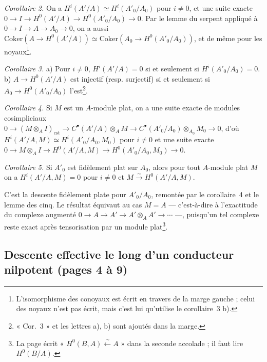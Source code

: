 \documentclass[11pt,a4paper]{article}
\begin{document}
\emph{Corollaire 2.} On a $H^i(A'/A) \simeq H^i(A'_0/A_0)$ pour $i \neq 0$,
et une suite exacte $0 \to I \to H^0(A'/A) \to H^0(A'_0/A_0) \to 0$. Par
le lemme du serpent appliqué à $0 \to I \to A \to A_0 \to 0$, on a aussi
$\mathrm{Coker}(A \to H^0(A'/A)) \simeq \mathrm{Coker}(A_0 \to
H^0(A'_0/A_0))$, et de même pour les noyaux\footnote{L'isomorphisme des
conoyaux est écrit en travers de la marge gauche ; celui des noyaux n'est pas
écrit, mais c'est lui qu'utilise le corollaire~3 b).}.

\emph{Corollaire 3.} a) Pour $i \neq 0$, $H^i(A'/A) = 0$ si et seulement si
$H^i(A'_0/A_0) = 0$. b) $A \to H^0(A'/A)$ est injectif (resp. surjectif) si
et seulement si $A_0 \to H^0(A'_0/A_0)$ l'est\footnote{« Cor.~3 » et les
lettres a), b) sont ajoutés dans la marge.}.

\emph{Corollaire 4.} Si $M$ est un $A$-module plat, on a une suite exacte de
modules cosimpliciaux $0 \to (M \otimes_A I)_{\mathrm{cst}} \to
C^{\bullet}(A'/A) \otimes_A M \to C^{\bullet}(A'_0/A_0) \otimes_{A_0} M_0
\to 0$, d'où $H^i(A'/A, M) \simeq H^i(A'_0/A_0, M_0)$ pour $i \neq 0$ et une
suite exacte $0 \to M \otimes_A I \to H^0(A'/A, M) \to H^0(A'_0/A_0, M_0)
\to 0$.

\emph{Corollaire 5.} Si $A'_0$ est fidèlement plat sur $A_0$, alors pour
tout $A$-module plat $M$ on a $H^i(A'/A, M) = 0$ pour $i \neq 0$ et $M
\xrightarrow{\sim} H^0(A'/A, M)$.

C'est la descente fidèlement plate pour $A'_0/A_0$, remontée par le
corollaire~4 et le lemme des cinq. Le résultat équivaut au cas $M = A$ —
c'est-à-dire à l'exactitude du complexe augmenté $0 \to A \to A' \to A'
\otimes_A A' \to \cdots$ —, puisqu'un tel complexe reste exact après
tensorisation par un module plat\footnote{La page écrit « $H^0(B, A)
\xleftarrow{\sim} A$ » dans la seconde accolade ; il faut lire $H^0(B/A)$.}.

\subsection*{Descente effective le long d'un conducteur nilpotent (pages 4 à 9)}
\end{document}
